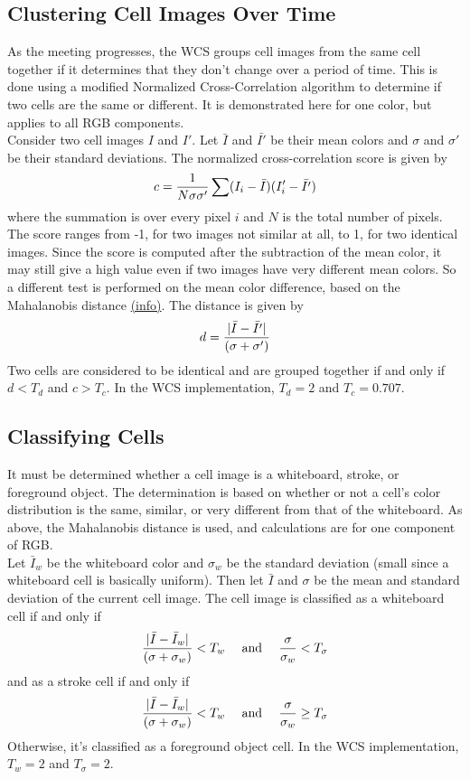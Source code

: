 \documentclass[]{article}
\begin{document}
	\subsection*{Clustering Cell Images Over Time}
	As the meeting progresses, the WCS groups cell images from the same cell together if it determines that they don't change over a period of time.  This is done using a modified Normalized Cross-Correlation algorithm to determine if two cells are the same or different.  It is demonstrated here for one color, but applies to all RGB components.  \\
Consider two cell images $I$ and $I'$.  Let $\bar{I}$ and $\bar{I'}$ be their mean colors and $\sigma$ and $\sigma'$ be their standard deviations.  The normalized cross-correlation score is given by \[ c={1 \over N \sigma \sigma'} \sum (I_i - \bar{I})(I_i' - \bar{I'}) \]
where the summation is over every pixel $i$ and $N$ is the total number of pixels.  The score ranges from -1, for two images not similar at all, to 1, for two identical images.  Since the score is computed after the subtraction of the mean color, it may still give a high value even if two images have very different mean colors.  So a different test is performed on the mean color difference, based on the Mahalanobis distance \href{http://en.wikipedia.org/wiki/Mahalanobis_distance}{(info)}.  The distance is given by 
\[ d={|\bar{I}-\bar{I'}| \over (\sigma + \sigma')} \]
Two cells are considered to be identical and are grouped together if and only if $d<T_d$ and $c>T_c$.  In the WCS implementation, $T_d=2$ and $T_c=0.707$.
	\subsection*{Classifying Cells}
It must be determined whether a cell image is a whiteboard, stroke, or foreground object.  The determination is based on whether or not a cell's color distribution is the same, similar, or very different from that of the whiteboard.  As above, the Mahalanobis distance is used, and calculations are for one component of RGB.  \\
\indent Let $\bar{I}_w$ be the whiteboard color and $\sigma_w$ be the standard deviation (small since a whiteboard cell is basically uniform).  Then let $\bar{I}$ and $\sigma$ be the mean and standard deviation of the current cell image.  The cell image is classified as a whiteboard cell if and only if \[ {|\bar{I} - \bar{I}_w| \over (\sigma + \sigma_w)}<T_w \quad \textrm{ and } \quad  {\sigma \over \sigma_w }< T_\sigma \] 
and as a stroke cell if and only if
\[{|\bar{I}-\bar{I}_w| \over (\sigma + \sigma_w)}<T_w \quad \textrm{ and } \quad {\sigma \over \sigma_w} \geq T_\sigma \] 
Otherwise, it's classified as a foreground object cell.  In the WCS implementation, $T_w=2$ and $T_\sigma=2$.
\end{document}
